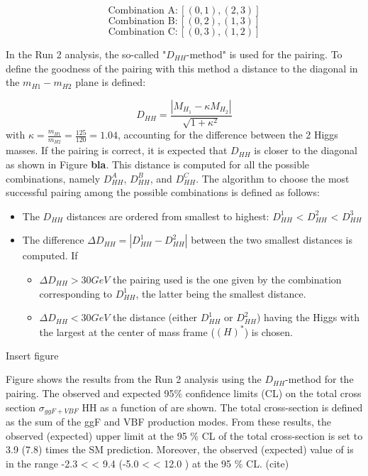 \begin{equation*}
   \text{Combination A}:[(0,1),(2,3)] 
\end{equation*}
\begin{equation*}
   \text{Combination B}:[(0,2),(1,3)] 
\end{equation*}
\begin{equation*}
   \text{Combination C}:[(0,3),(1,2)] 
\end{equation*}

In the Run 2 analysis, the so-called "$D_{HH}$-method" is used for the pairing. To define the goodness of the pairing with this method a distance to the diagonal in the $m_{H1}-m_{H2}$ plane is defined:

\begin{equation}
    D_{HH}=\frac{|M_{H_1}- \kappa M_{H_2}|}{\sqrt{1+\kappa^2}}
    \label{eq: dist dhh}
\end{equation}
\noindent with $\kappa=\frac{m_{H1}}{m_{H2}}=\frac{125}{120}=1.04$, accounting for the difference between the 2 Higgs masses. If the pairing is correct, it is expected that $D_{HH}$ is closer to the diagonal as shown in Figure \textbf{bla}. This distance is computed for all the possible combinations, namely $D_{HH}^A$, $D_{HH}^B$, and $D_{HH}^C$. The algorithm to choose the most successful pairing among the possible combinations is defined as follows:
\begin{itemize}
    \item The $D_{HH}$ distances are ordered from smallest to highest: $D^1_{HH}$ < $D^2_{HH}$ < $D^3_{HH}$
    \item The difference $\Delta D_{HH}= |D_{HH}^1- D_{HH}^2|$ between the two smallest distances is computed. If
        \begin{itemize}
            \item $\Delta D_{HH} > 30 GeV$ the pairing used is the one given by the combination corresponding to $D_{HH}^1$, the latter being the smallest distance.
            \item $\Delta D_{HH} < 30 GeV$ the distance (either $D_{HH}^1$ or $D_{HH}^2$) having the Higgs with the largest \pt at the center of mass frame (\pt$(H)^*$) is chosen.
        \end{itemize}
\end{itemize}

Insert figure

Figure shows the results from the Run 2 analysis using the $D_{HH}$-method for the pairing. The observed and expected 95\% confidence limits (CL) on the total cross section $\sigma_{ggF+VBF}$ HH as a function of \kl are shown. The total cross-section is defined as the sum of the ggF and VBF production modes. From these results, the observed (expected) upper limit at the 95 \% CL of the total cross-section is set to 3.9 (7.8) times the SM prediction. Moreover, the observed (expected) value of \kl is in the range -2.3 < \kl < 9.4 (-5.0 < \kl < 12.0 ) at the 95 \% CL. (cite)


